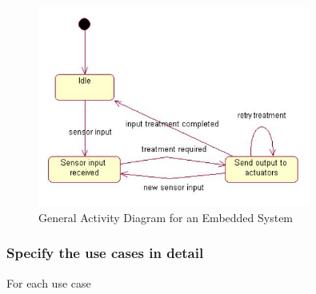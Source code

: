 \documentclass{overturerepchap}
\begin{document}
\begin{figure}
\begin{center}
\includegraphics[width=0.8\textwidth]{figures/generalstatedia.jpg}
\end{center}
\caption{General Activity Diagram for an Embedded System}\label{fig:activitydiag}
\end{figure}


\subsubsection{Specify the use cases in detail}

For each use case
\end{document}
